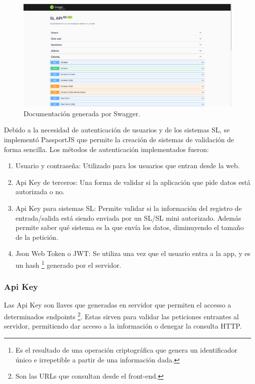 \begin{figure}[bth]
    \centering
    \includegraphics[width=\textwidth]{imgs/server/swagger.png}
    \caption{Documentación generada por Swagger.}
    \label{fig:swagger-example}
\end{figure}

Debido a la necesidad de autenticación de usuarios y de los sistemas SL, se implementó PassportJS que permite la creación de sistemas de validación de forma sencilla. Los métodos de autenticación implementados fueron:

\begin{enumerate}
    \item Usuario y contraseña: Utilizado para los usuarios que entran desde la web.
    \item Api Key de terceros: Una forma de validar si la aplicación que pide datos está autorizada o no.
    \item Api Key para sistemas SL: Permite validar si la información del registro de entrada/salida está siendo enviada por un SL/SL mini autorizado. Además permite saber qué sistema es la que envía los datos, diminuyendo el tamaño de la petición.
    \item Json Web Token o JWT: Se utiliza una vez que el usuario entra a la app, y es un
          hash \footnote{Es el resultado de una operación criptográfica que genera un identificador único e irrepetible a partir de una información dada.}
          generado por el servidor.
\end{enumerate}

\subsubsection{Api Key}

Las Api Key son llaves que generadas en servidor que permiten el accesso a determinados
endpoints \footnote{Son las URLs que consultan desde el front-end.}.
Estas sirven para validar las peticiones entrantes al servidor, permitiendo dar acceso a la información o denegar la consulta HTTP.

